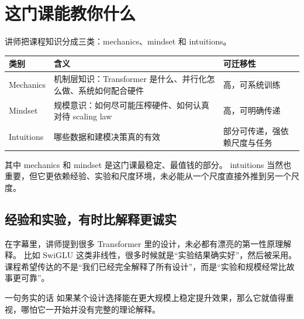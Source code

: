 \section{这门课能教你什么}

讲师把课程知识分成三类：mechanics、mindset 和 intuitions。

\begin{table}[H]
\centering
\begin{tabular}{p{2.6cm}p{4.8cm}p{6.2cm}}
\toprule
\textbf{类别} & \textbf{含义} & \textbf{可迁移性} \\
\midrule
Mechanics & 机制层知识：Transformer 是什么、并行化怎么做、系统如何配合硬件 & 高，可系统训练 \\
Mindset & 规模意识：如何尽可能压榨硬件、如何认真对待 scaling law & 高，可明确传递 \\
Intuitions & 哪些数据和建模决策真的有效 & 部分可传递，强依赖尺度与任务 \\
\bottomrule
\end{tabular}
\end{table}

其中 mechanics 和 mindset 是这门课最稳定、最值钱的部分。
intuitions 当然也重要，但它更依赖经验、实验和尺度环境，未必能从一个尺度直接外推到另一个尺度。

\subsection{经验和实验，有时比解释更诚实}

在字幕里，讲师提到很多 Transformer 里的设计，未必都有漂亮的第一性原理解释。
比如 SwiGLU 这类非线性，很多时候就是“实验结果确实好”，然后被采用。
课程希望传达的不是“我们已经完全解释了所有设计”，而是“实验和规模经常比故事更可靠”。

\begin{importantbox}{一句务实的话}
如果某个设计选择能在更大规模上稳定提升效果，那么它就值得重视，哪怕它一开始并没有完整的理论解释。
\end{importantbox}


